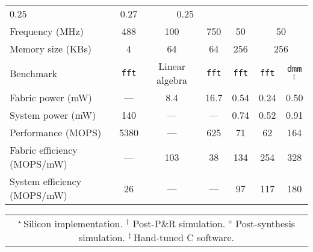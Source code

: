 {\begin{table*}[h]
\begin{tabular}{lcccc@{\hskip 2em}cc}
	0.25 &
	0.27 &
	\multicolumn{2}{c}{0.25} \\
        Frequency (MHz) &
        488 &
        100 &
        750 &
        50 &
        \multicolumn{2}{c}{50} \\
        Memory size (KBs) &
        4 &
        64 &
        64 &
        256 &
        \multicolumn{2}{c}{256} \\
        \midrule
        Benchmark &
        {\tt fft} &
        Linear algebra &
        {\tt fft} &
        {\tt fft} &
        {\tt fft} & {\tt dmm$^\ddag$} \\
	Fabric power (mW) &
	--- &
	8.4 &
	16.7 &
	0.54 &
	0.24 & 0.50 \\
	System power (mW) &
	140 &
	--- &
	--- &
	0.74 &
	0.52 & 0.91\\
	Performance (MOPS) &
	5380 &
	--- &
	625 &
	71 &
	62 & 164 \\
	Fabric efficiency (MOPS/mW) &
	--- &
	103 &
	38 &
	134 &
	254 & 328 \\
	System efficiency (MOPS/mW) &
	26 &
	--- &
	--- &
	97 &
	117 & 180\\
	\bottomrule
      \end{tabular}
    
    \vspace{1pt}
    
    \begin{tabular}{c}
      $^\star$\,Silicon implementation. \quad
      $^\dagger$ Post-P\&R simulation. \quad
      $^\diamond$ Post-synthesis simulation. \quad
      $^\ddag$\,Hand-tuned C software. %
    \end{tabular}
  \end{table*}
}

